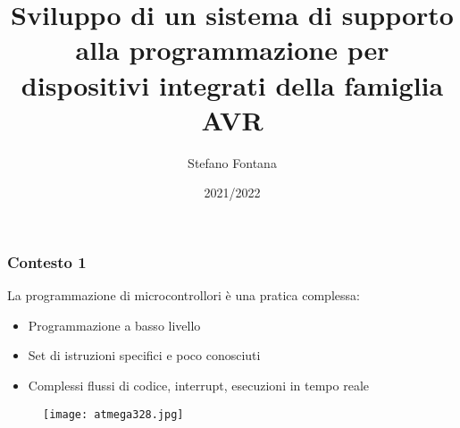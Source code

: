 \documentclass[aspectratio=169,
]{beamer}
\title[Relazione Finale]{Sviluppo di un sistema di supporto alla programmazione per dispositivi integrati della famiglia AVR}
\author[S.Fontana --- 727199]{Stefano Fontana}
\date{2021/2022}
\begin{document}
    \maketitle

    \begin{frame}
        \frametitle{Contesto \hfill 1}
    
        La programmazione di microcontrollori è una pratica complessa:

        \begin{minipage}{.65\textwidth}
            \begin{itemize}
                \item <1-> Programmazione a basso livello
                \item <2-> Set di istruzioni specifici e poco conosciuti
                \item <3-> Complessi flussi di codice, interrupt, esecuzioni in tempo reale
            \end{itemize}
        \end{minipage}
        \begin{minipage}{.34\textwidth}
            \begin{figure}
                \texttt{[image: atmega328.jpg]}
            \end{figure}
        \end{minipage}
    \end{frame}
\end{document}

